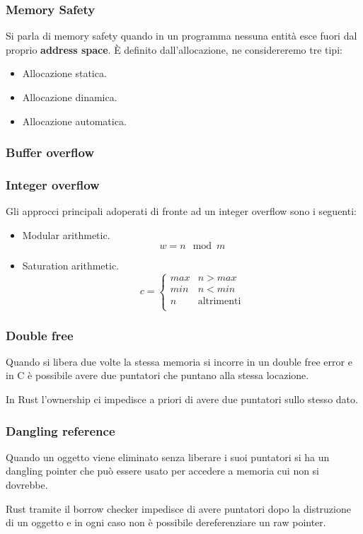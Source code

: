\documentclass{beamer}
\begin{document}
\begin{frame}
    \frametitle{Memory Safety}
    Si parla di memory safety quando in un programma nessuna entità esce fuori dal proprio \textbf{address space}. 
    È definito dall'allocazione, ne considereremo tre tipi:
    \begin{itemize}
        \item Allocazione statica.
        \item Allocazione dinamica.
        \item Allocazione automatica.
    \end{itemize}    
\end{frame}

\begin{frame}
    \frametitle{Buffer overflow}
    
        
\end{frame}

\begin{frame}
    \frametitle{Integer overflow}
    Gli approcci principali adoperati di fronte ad un integer overflow sono i seguenti:
    \begin{itemize}
        \item Modular arithmetic. \[ w = n \mod m \]
        \item Saturation arithmetic. 
        \[ 
            c = \begin{cases}
            max & n > max \\
            min & n < min \\
            n  & \text{altrimenti} \\
        \end{cases} 
        \]
    \end{itemize}
\end{frame}

\begin{frame}
    \frametitle{Double free}
    Quando si libera due volte la stessa memoria si incorre in un double free error e in C è possibile avere due puntatori che puntano alla stessa locazione.

    In Rust l'ownership ci impedisce a priori di avere due puntatori sullo stesso dato. 
\end{frame}

\begin{frame}
    \frametitle{Dangling reference}
    Quando un oggetto viene eliminato senza liberare i suoi puntatori si ha un dangling pointer che può essere usato per accedere a memoria cui non si dovrebbe. 
    
    Rust tramite il borrow checker impedisce di avere puntatori dopo la distruzione di un oggetto e in ogni caso non è possibile dereferenziare un raw pointer.
\end{frame}
\end{document}
